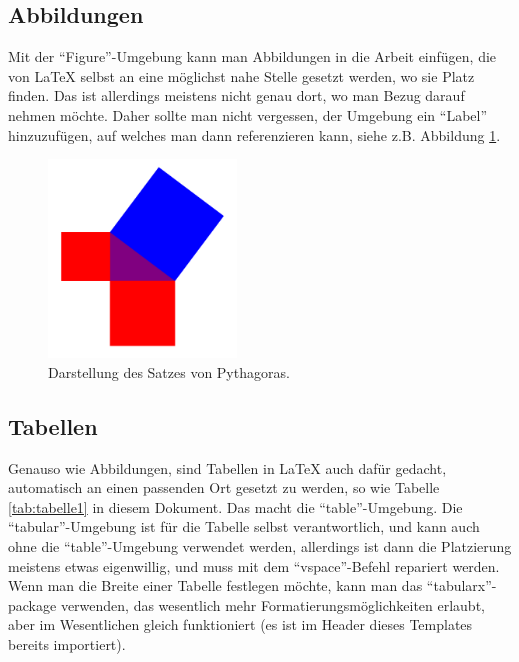 \subsection{Abbildungen}

Mit der ``Figure''-Umgebung kann man Abbildungen in die Arbeit einfügen, die von LaTeX selbst an eine möglichst nahe Stelle gesetzt werden, wo sie Platz finden. Das ist allerdings meistens nicht genau dort, wo man Bezug darauf nehmen möchte. Daher sollte man nicht vergessen, der Umgebung ein ``Label'' hinzuzufügen, auf welches man dann referenzieren kann, siehe z.B. Abbildung \ref{abb:bild1}.

\begin{figure}[h] %
    \centering %
    \includegraphics[width=5cm]{content/figures/Pythagoras.PNG}
    \caption{Darstellung des Satzes von Pythagoras.}
    \label{abb:bild1}
\end{figure}

\subsection{Tabellen}

Genauso wie Abbildungen, sind Tabellen in LaTeX auch dafür gedacht, automatisch an einen passenden Ort gesetzt zu werden, so wie Tabelle \ref{tab:tabelle1} in diesem Dokument. Das macht die ``table''-Umgebung. Die ``tabular''-Umgebung ist für die Tabelle selbst verantwortlich, und kann auch ohne die ``table''-Umgebung verwendet werden, allerdings ist dann die Platzierung meistens etwas eigenwillig, und muss mit dem ``vspace''-Befehl repariert werden. Wenn man die Breite einer Tabelle festlegen möchte, kann man das ``tabularx''-package verwenden, das wesentlich mehr Formatierungsmöglichkeiten erlaubt, aber im Wesentlichen gleich funktioniert (es ist im Header dieses Templates bereits importiert).

